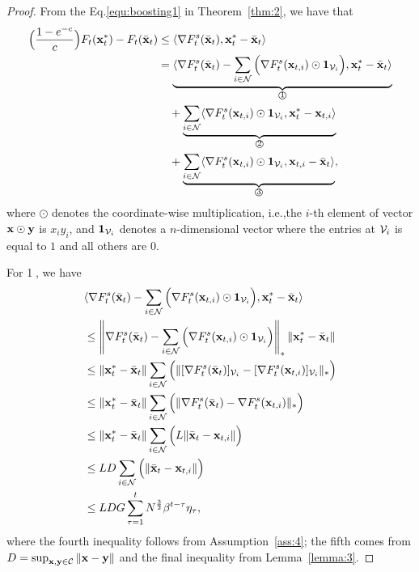 	\begin{proof}
		From the Eq.\eqref{equ:boosting1} in Theorem~\ref{thm:2}, we have that
		\begin{equation}
			\label{equ:lemma_result_0}
			\begin{aligned}
				\Big(\frac{1-e^{-c}}{c}\Big)F_{t}(\mathbf{x}_{t}^{*})-F_{t}(\bar{\mathbf{x}}_{t})&\le\langle\nabla F_{t}^{s}(\bar{\mathbf{x}}_{t}),\mathbf{x}_{t}^{*}-\bar{\mathbf{x}}_{t}\rangle\\
				&=\underbrace{\langle\nabla F_{t}^{s}(\bar{\mathbf{x}}_{t})-\sum_{i\in\mathcal{N}}\Big(\nabla F_{t}^{s}(\mathbf{x}_{t,i})\odot\mathbf{1}_{\mathcal{V}_{i}}\Big),\mathbf{x}_{t}^{*}-\bar{\mathbf{x}}_{t}\rangle}_{\text{\textcircled{1}}}\\
				&\quad+\underbrace{\sum_{i\in\mathcal{N}}\langle\nabla F_{t}^{s}(\mathbf{x}_{t,i})\odot\mathbf{1}_{\mathcal{V}_{i}},\mathbf{x}_{t}^{*}-\mathbf{x}_{t,i}\rangle}_{\text{\textcircled{2}}}\\
				&\quad +\underbrace{\sum_{i\in\mathcal{N}}\langle\nabla F_{t}^{s}(\mathbf{x}_{t,i})\odot\mathbf{1}_{\mathcal{V}_{i}},\mathbf{x}_{t,i}-\bar{\mathbf{x}}_{t}\rangle}_{\text{\textcircled{3}}},
			\end{aligned}
		\end{equation} where $\odot$ denotes the coordinate-wise multiplication, i.e.,the $i$-th element of vector $\mathbf{x}\odot\mathbf{y}$ is $x_{i}y_{i}$, and $\mathbf{1}_{\mathcal{V}_{i}}$ denotes a $n$-dimensional vector where the entries at $\mathcal{V}_{i}$ is equal to $1$ and all others are $0$.
		
		For \textcircled{1}, we have
		\begin{equation}\label{equ:lemma_result_1}
			\begin{aligned}
				&\langle\nabla F_{t}^{s}(\bar{\mathbf{x}}_{t})-\sum_{i\in\mathcal{N}}\Big(\nabla F_{t}^{s}(\mathbf{x}_{t,i})\odot\mathbf{1}_{\mathcal{V}_{i}}\Big),\mathbf{x}_{t}^{*}-\bar{\mathbf{x}}_{t}\rangle\\
				&\le\left\|\nabla F_{t}^{s}(\bar{\mathbf{x}}_{t})-\sum_{i\in\mathcal{N}}\Big(\nabla  F_{t}^{s}(\mathbf{x}_{t,i})\odot\mathbf{1}_{\mathcal{V}_{i}}\Big)\right\|_{*}\left\|\mathbf{x}_{t}^{*}-\bar{\mathbf{x}}_{t}\right\|\\
				&\le\|\mathbf{x}^{*}_{t}-\bar{\mathbf{x}}_{t}\|\sum_{i\in\mathcal{N}}\Big(\|[\nabla F_{t}^{s}(\bar{\mathbf{x}}_{t})]_{\mathcal{V}_{i}}-[\nabla F_{t}^{s}(\mathbf{x}_{t,i})]_{\mathcal{V}_{i}}\|_{*}\Big)\\
				&\le\|\mathbf{x}^{*}_{t}-\bar{\mathbf{x}}_{t}\|\sum_{i\in\mathcal{N}}\Big(\|\nabla F_{t}^{s}(\bar{\mathbf{x}}_{t})-\nabla F_{t}^{s}(\mathbf{x}_{t,i})\|_{*}\Big)\\
				&\le\|\mathbf{x}^{*}_{t}-\bar{\mathbf{x}}_{t}\|\sum_{i\in\mathcal{N}}\Big(L\|\bar{\mathbf{x}}_{t}-\mathbf{x}_{t,i}\|\Big)\\
				&\le LD\sum_{i\in\mathcal{N}}\Big(\|\bar{\mathbf{x}}_{t}-\mathbf{x}_{t,i}\|\Big)\\
				&\le LDG\sum_{\tau=1}^{t}N^{\frac{3}{2}}\beta^{t-\tau}\eta_{\tau},
			\end{aligned}
		\end{equation} where  the fourth inequality follows from Assumption~\ref{ass:4}; the fifth comes from  $D=\sup_{\mathbf{x},\mathbf{y}\in\mathcal{C}}\|\mathbf{x}-\mathbf{y}\|$ and the final inequality from Lemma~\ref{lemma:3}.
		

\end{proof}
